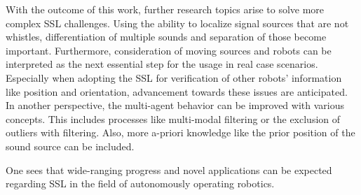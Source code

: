 With the outcome of this work, further research topics arise to solve
more complex \ac{SSL} challenges.
Using the ability to localize signal sources that are not whistles,
differentiation of multiple sounds and separation of those become important.
Furthermore, consideration of moving sources and robots can be interpreted
as the next essential step for the usage in real case scenarios.
Especially when adopting the \ac{SSL} for verification of other robots' information
like position and orientation, advancement towards these issues are anticipated.
In another perspective, the multi-agent behavior can be improved with various
concepts.
This includes processes like multi-modal filtering or the exclusion of outliers
with filtering.
Also, more a-priori knowledge like the prior position of the sound source can be included.

One sees that wide-ranging progress and novel applications can be expected regarding \ac{SSL}
in the field of autonomously operating robotics.




